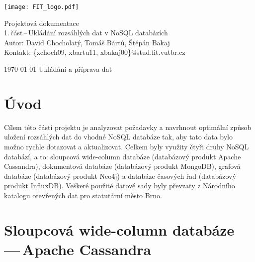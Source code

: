 \documentclass[a4paper, 11pt]{article}
\begin{document}
	\begin{titlepage}
		\begin{center}
			\texttt{[image: FIT\_logo.pdf]} \\


			\Huge{Projektová dokumentace} \\[0.3em]

			\LARGE{1.\,část\,--\,Ukládání rozsáhlých dat v NoSQL databázích} \\[0.6em]

                \Large{Autor: David Chocholatý, Tomáš Bártů, Štěpán Bakaj \\ Kontakt: \{xchoch09, xbartu11, xbakaj00\}@stud.fit.vutbr.cz}

		\end{center}

		{\Large
			\today
			\hfill
                Ukládání a příprava dat
		}
	\end{titlepage}



	\tableofcontents
	\clearpage

	\section{Úvod}

	Cílem této části projektu je analyzovat požadavky a navrhnout optimální způsob uložení rozsáhlých dat do vhodné NoSQL databáze tak, aby tato data bylo možno rychle dotazovat a aktualizovat. Celkem byly využity čtyři druhy NoSQL databází, a to: sloupcová wide-column databáze (databázový produkt Apache Cassandra), dokumentová databáze (databázový produkt MongoDB), grafová databáze (databázový produkt Neo4j) a databáze časových řad (databázový produkt InfluxDB). Veškeré použité datové sady byly převzaty z Národního katalogu otevřených dat pro statutární město Brno.

    \newpage
    \section{Sloupcová wide-column databáze\,---\,Apache Cassandra}
\end{document}
